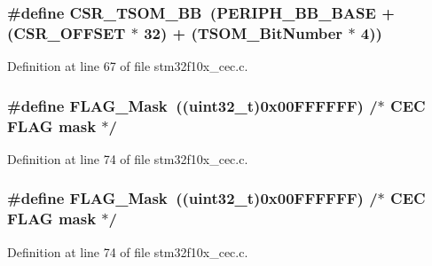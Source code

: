 \subsubsection[{\texorpdfstring{C\+S\+R\+\_\+\+T\+S\+O\+M\+\_\+\+BB}{CSR_TSOM_BB}}]{\setlength{\rightskip}{0pt plus 5cm}\#define C\+S\+R\+\_\+\+T\+S\+O\+M\+\_\+\+BB~({\bf P\+E\+R\+I\+P\+H\+\_\+\+B\+B\+\_\+\+B\+A\+SE} + ({\bf C\+S\+R\+\_\+\+O\+F\+F\+S\+ET} $\ast$ 32) + ({\bf T\+S\+O\+M\+\_\+\+Bit\+Number} $\ast$ 4))}\hypertarget{group___c_e_c___private___defines_ga4971cc50b0ead4a493e2a9c03966c826}{}\label{group___c_e_c___private___defines_ga4971cc50b0ead4a493e2a9c03966c826}


Definition at line 67 of file stm32f10x\+\_\+cec.\+c.

\subsubsection[{\texorpdfstring{F\+L\+A\+G\+\_\+\+Mask}{FLAG_Mask}}]{\setlength{\rightskip}{0pt plus 5cm}\#define F\+L\+A\+G\+\_\+\+Mask~(({\bf uint32\+\_\+t})0x00\+F\+F\+F\+F\+F\+F) /$\ast$ C\+E\+C F\+L\+A\+G mask $\ast$/}\hypertarget{group___c_e_c___private___defines_ga2be62bf481cd44de9ab604efe5595ff6}{}\label{group___c_e_c___private___defines_ga2be62bf481cd44de9ab604efe5595ff6}


Definition at line 74 of file stm32f10x\+\_\+cec.\+c.

\subsubsection[{\texorpdfstring{F\+L\+A\+G\+\_\+\+Mask}{FLAG_Mask}}]{\setlength{\rightskip}{0pt plus 5cm}\#define F\+L\+A\+G\+\_\+\+Mask~(({\bf uint32\+\_\+t})0x00\+F\+F\+F\+F\+F\+F) /$\ast$ C\+E\+C F\+L\+A\+G mask $\ast$/}\hypertarget{group___c_e_c___private___defines_ga2be62bf481cd44de9ab604efe5595ff6}{}\label{group___c_e_c___private___defines_ga2be62bf481cd44de9ab604efe5595ff6}


Definition at line 74 of file stm32f10x\+\_\+cec.\+c.

